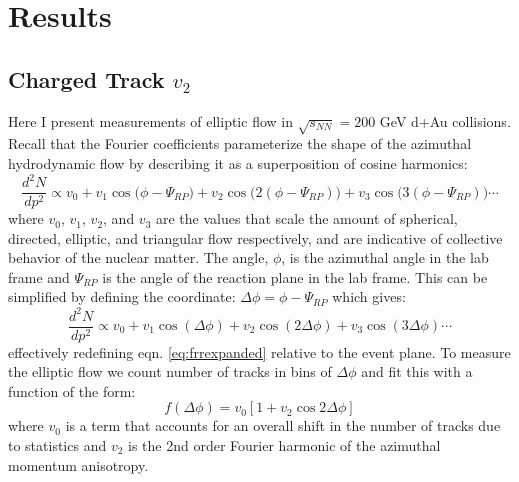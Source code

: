 
\chapter{Results} %
\section{Charged Track $v_{2}$}
\label{sect:alltracks}
Here I present measurements of elliptic flow in $\sqrt{s_{NN}}=200$ GeV d+Au collisions. Recall that the Fourier coefficients parameterize the shape of the azimuthal hydrodynamic flow by describing it as a superposition of cosine harmonics:
\begin{equation} \label{eq:frrexpanded}
\frac{d^{2}N}{dp^{2}} \propto v_0 + v_1 \cos\big(\phi - \Psi_{RP}\big) + v_2 \cos\big(2(\phi - \Psi_{RP})\big) + v_3 \cos\big(3(\phi - \Psi_{RP})\big) \cdots
\end{equation}
where $v_0$, $v_1$, $v_2$, and $v_3$ are the values that scale the amount of spherical, directed, elliptic, and triangular flow respectively, and are indicative of collective behavior of the nuclear matter. The angle, $\phi$, is the azimuthal angle in the lab frame and $\Psi_{RP}$ is the angle of the reaction plane in the lab frame. This can be simplified by defining the coordinate: $\Delta \phi = \phi - \Psi_{RP}$ which gives:
\begin{equation} 
\frac{d^{2}N}{dp^{2}} \propto v_0 + v_1 \cos(\Delta \phi) + v_2 \cos(2\Delta \phi) + v_3 \cos(3\Delta \phi) \cdots
\end{equation}
effectively redefining eqn. \ref{eq:frrexpanded} relative to the event plane. To measure the elliptic flow we count number of tracks in bins of $\Delta \phi$ and fit this with a function of the form:
\begin{equation}
\label{v2fitfn}
f(\Delta \phi) = v_0 [1 + v_2 \cos 2 \Delta \phi]
\end{equation}
where $v_0$ is a term that accounts for an overall shift in the number of tracks due to statistics and $v_2$ is the 2nd order Fourier harmonic of the azimuthal momentum anisotropy. 



